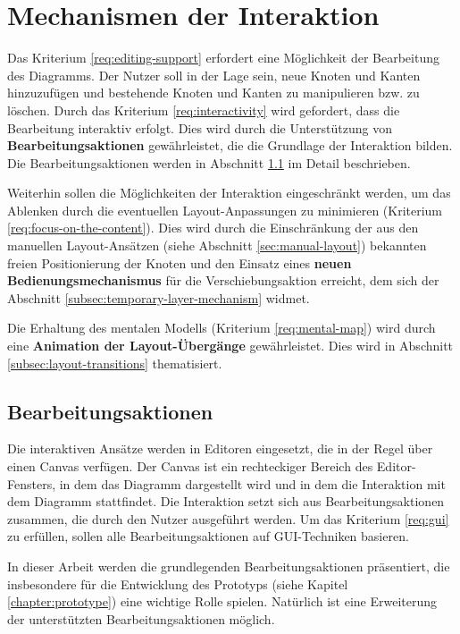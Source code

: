 \section{Mechanismen der Interaktion}
\label{sec:interaction-mechanisms}

Das Kriterium \ref{req:editing-support} erfordert eine Möglichkeit der Bearbeitung des Diagramms. Der Nutzer soll in der Lage sein, neue Knoten und Kanten hinzuzufügen und bestehende Knoten und Kanten zu manipulieren bzw. zu löschen. Durch das Kriterium \ref{req:interactivity} wird gefordert, dass die Bearbeitung interaktiv erfolgt. Dies wird durch die Unterstützung von \textbf{Bearbeitungsaktionen} gewährleistet, die die Grundlage der Interaktion bilden. Die Bearbeitungsaktionen werden in Abschnitt \ref{subsec:edit-actions} im Detail beschrieben.

Weiterhin sollen die Möglichkeiten der Interaktion eingeschränkt werden, um das Ablenken durch die eventuellen Layout-Anpassungen zu minimieren (Kriterium \ref{req:focus-on-the-content}). Dies wird durch die Einschränkung der aus den manuellen Layout-Ansätzen (siehe Abschnitt \ref{sec:manual-layout}) bekannten freien Positionierung der Knoten und den Einsatz eines \textbf{neuen Bedienungsmechanismus} für die Verschiebungsaktion erreicht, dem sich der Abschnitt \ref{subsec:temporary-layer-mechanism} widmet.

Die Erhaltung des mentalen Modells (Kriterium \ref{req:mental-map}) wird durch eine \textbf{Animation der Layout-Übergänge} gewährleistet. Dies wird in Abschnitt \ref{subsec:layout-transitions} thematisiert.

\subsection{Bearbeitungsaktionen}
\label{subsec:edit-actions}

Die interaktiven Ansätze werden in Editoren eingesetzt, die in der Regel über einen Canvas verfügen. Der Canvas ist ein rechteckiger Bereich des Editor-Fensters, in dem das Diagramm dargestellt wird und in dem die Interaktion mit dem Diagramm stattfindet. Die Interaktion setzt sich aus Bearbeitungsaktionen zusammen, die durch den Nutzer ausgeführt werden. Um das Kriterium \ref{req:gui} zu erfüllen, sollen alle Bearbeitungsaktionen auf GUI-Techniken basieren.

In dieser Arbeit werden die grundlegenden Bearbeitungsaktionen präsentiert, die insbesondere für die Entwicklung des Prototyps (siehe Kapitel \ref{chapter:prototype}) eine wichtige Rolle spielen. Natürlich ist eine Erweiterung der unterstützten Bearbeitungsaktionen möglich.

